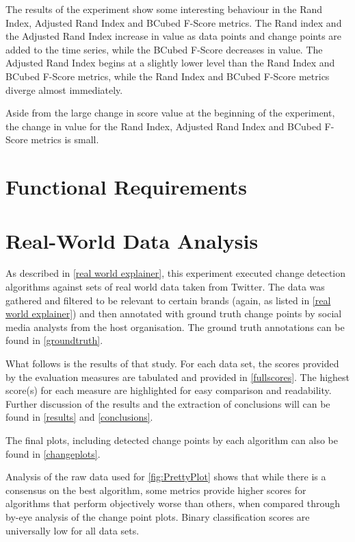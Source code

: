 \documentclass[../main.tex]{subfiles}
\begin{document}
The results of the experiment show some interesting behaviour in the Rand Index, Adjusted Rand Index and BCubed F-Score metrics. The Rand index and the Adjusted Rand Index increase in value as data points and change points are added to the time series, while the BCubed F-Score decreases in value. The Adjusted Rand Index begins at a slightly lower level than the Rand Index and BCubed F-Score metrics, while the Rand Index and BCubed F-Score metrics diverge almost immediately.

Aside from the large change in score value at the beginning of the experiment, the change in value for the Rand Index, Adjusted Rand Index and BCubed F-Score metrics is small.

\section{Functional Requirements}

\section{Real-World Data Analysis}

As described in \autoref{real world explainer}, this experiment executed change detection algorithms against sets of real world data taken from Twitter. The data was gathered and filtered to be relevant to certain brands (again, as listed in \autoref{real world explainer}) and then annotated with ground truth change points by social media analysts from the host organisation. The ground truth annotations can be found in \autoref{groundtruth}.

What follows is the results of that study. For each data set, the scores provided by the evaluation measures are tabulated and provided in \autoref{fullscores}. The highest score(s) for each measure are highlighted for easy comparison and readability. Further discussion of the results and the extraction of conclusions will can be found in \autoref{results} and \autoref{conclusions}.

The final plots, including detected change points by each algorithm can also be found in \autoref{changeplots}.

Analysis of the raw data used for \autoref{fig:PrettyPlot} shows that while there is a consensus on the best algorithm, some metrics provide higher scores for algorithms that perform objectively worse than others, when compared through by-eye analysis of the change point plots. Binary classification scores are universally low for all data sets.
\end{document}
